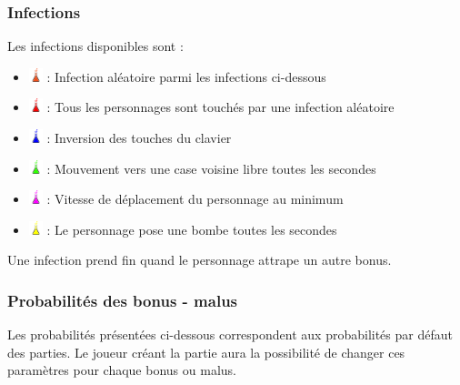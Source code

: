 \subsubsection{Infections}

Les infections disponibles sont :
\begin{itemize}
\item[] \includegraphics[width=15px,height=15px]{images/crane.png} : Infection aléatoire parmi les infections ci-dessous
\item[] \includegraphics[width=15px,height=15px]{images/hell.png} : Tous les personnages sont touchés par une infection aléatoire
\item[] \includegraphics[width=15px,height=15px]{images/confusion.png} : Inversion des touches du clavier
\item[] \includegraphics[width=15px,height=15px]{images/spasme.png} : Mouvement vers une case voisine libre toutes les \nbSecondes secondes
\item[] \includegraphics[width=15px,height=15px]{images/dilatation.png} : Vitesse de déplacement du personnage au minimum
\item[] \includegraphics[width=15px,height=15px]{images/rage.png} : Le personnage pose une bombe toutes les \nbSecondes secondes
\end{itemize}

\vspace{0.3cm}

Une infection prend fin quand le personnage attrape un autre bonus.

\subsubsection{Probabilités des bonus - malus}

Les probabilités présentées ci-dessous correspondent aux probabilités par défaut des parties. Le joueur créant la partie aura la possibilité de changer ces paramètres pour chaque bonus ou malus.

